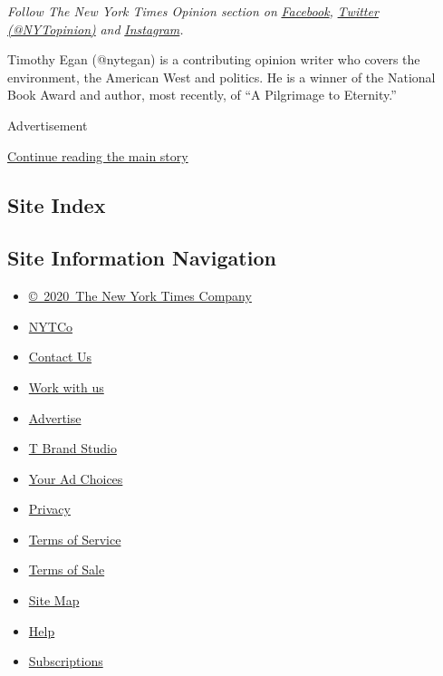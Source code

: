 \emph{Follow The New York Times Opinion section on}
\href{https://www.facebookcorewwwi.onion/nytopinion}{\emph{Facebook}}\emph{,}
\href{http://twitter.com/NYTOpinion}{\emph{Twitter (@NYTopinion)}}
\emph{and}
\href{https://www.instagram.com/nytopinion/}{\emph{Instagram}}\emph{.}

Timothy Egan (@nytegan) is a contributing opinion writer who covers the
environment, the American West and politics. He is a winner of the
National Book Award and author, most recently, of ``A Pilgrimage to
Eternity.''

Advertisement

\protect\hyperlink{after-bottom}{Continue reading the main story}

\hypertarget{site-index}{%
\subsection{Site Index}\label{site-index}}

\hypertarget{site-information-navigation}{%
\subsection{Site Information
Navigation}\label{site-information-navigation}}

\begin{itemize}
\tightlist
\item
  \href{https://help.nytimes3xbfgragh.onion/hc/en-us/articles/115014792127-Copyright-notice}{©~2020~The
  New York Times Company}
\end{itemize}

\begin{itemize}
\tightlist
\item
  \href{https://www.nytco.com/}{NYTCo}
\item
  \href{https://help.nytimes3xbfgragh.onion/hc/en-us/articles/115015385887-Contact-Us}{Contact
  Us}
\item
  \href{https://www.nytco.com/careers/}{Work with us}
\item
  \href{https://nytmediakit.com/}{Advertise}
\item
  \href{http://www.tbrandstudio.com/}{T Brand Studio}
\item
  \href{https://www.nytimes3xbfgragh.onion/privacy/cookie-policy\#how-do-i-manage-trackers}{Your
  Ad Choices}
\item
  \href{https://www.nytimes3xbfgragh.onion/privacy}{Privacy}
\item
  \href{https://help.nytimes3xbfgragh.onion/hc/en-us/articles/115014893428-Terms-of-service}{Terms
  of Service}
\item
  \href{https://help.nytimes3xbfgragh.onion/hc/en-us/articles/115014893968-Terms-of-sale}{Terms
  of Sale}
\item
  \href{https://spiderbites.nytimes3xbfgragh.onion}{Site Map}
\item
  \href{https://help.nytimes3xbfgragh.onion/hc/en-us}{Help}
\item
  \href{https://www.nytimes3xbfgragh.onion/subscription?campaignId=37WXW}{Subscriptions}
\end{itemize}
